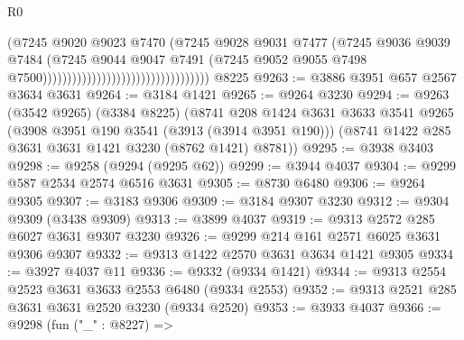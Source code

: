 \begin{lexlean}{R0}
\begin{coremodule}
                                                              (@7245
                                                                @9020
                                                                @9023
                                                                @7470
                                                                (@7245
                                                                  @9028
                                                                  @9031
                                                                  @7477
                                                                  (@7245
                                                                    @9036
                                                                    @9039
                                                                    @7484
                                                                    (@7245
                                                                      @9044
                                                                      @9047
                                                                      @7491
                                                                      (@7245
                                                                        @9052
                                                                        @9055
                                                                        @7498
                                                                        @7500))))))))))))))))))))))))))))))))))
    @8225
@9263 := @3886 @3951 @657 @2567 @3634 @3631
@9264 := @3184 @1421
@9265 := @9264 @3230
@9294 := @9263
    (@3542 @9265)
    (@3384 @8225)
    (@8741
      @208
      @1424
      @3631
      @3633
      @3541
      @9265
      (@3908 @3951 @190 @3541 (@3913 (@3914 @3951 @190)))
      (@8741 @1422 @285 @3631 @3631 @1421 @3230 (@8762 @1421) @8781))
@9295 := @3938 @3403
@9298 := @9258 (@9294 (@9295 @62))
@9299 := @3944 @4037
@9304 := @9299 @587 @2534 @2574 @6516 @3631
@9305 := @8730 @6480
@9306 := @9264 @9305
@9307 := @3183 @9306
@9309 := @3184 @9307 @3230
@9312 := @9304 @9309 (@3438 @9309)
@9313 := @3899 @4037
@9319 := @9313 @2572 @285 @6027 @3631 @9307 @3230
@9326 := @9299 @214 @161 @2571 @6025 @3631 @9306 @9307
@9332 := @9313 @1422 @2570 @3631 @3634 @1421 @9305
@9334 := @3927 @4037 @11
@9336 := @9332 (@9334 @1421)
@9344 := @9313 @2554 @2523 @3631 @3633 @2553 @6480 (@9334 @2553)
@9352 := @9313 @2521 @285 @3631 @3631 @2520 @3230 (@9334 @2520)
@9353 := @3933 @4037
@9366 := @9298
    (fun ("_" : @8227) =>

\end{coremodule}
\end{lexlean}
